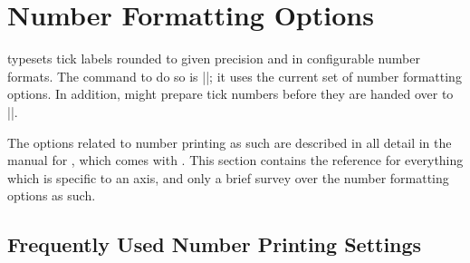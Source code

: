 
\section[reference.numberformatting]{Number Formatting Options}
\label{sec:number:printing}

\PGFPlots{} typesets tick labels rounded to given precision and in configurable
number formats. The command to do so is |\pgfmathprintnumber|; it uses the
current set of number formatting options. In addition, \PGFPlots{} might
prepare tick numbers before they are handed over to |\pgfmathprintnumber|.

The options related to number printing as such are described in all detail in
the manual for \PGFPlotstable{}, which comes with \PGFPlots{}. This section
contains the reference for everything which is specific to an axis, and only a
brief survey over the number formatting options as such.


\subsection{Frequently Used Number Printing Settings}
\label{sec:number:faq}

